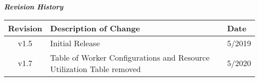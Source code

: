 \iffalse
This file is protected by Copyright. Please refer to the COPYRIGHT file
distributed with this source distribution.

This file is part of OpenCPI <http://www.opencpi.org>

OpenCPI is free software: you can redistribute it and/or modify it under the
terms of the GNU Lesser General Public License as published by the Free Software
Foundation, either version 3 of the License, or (at your option) any later
version.

OpenCPI is distributed in the hope that it will be useful, but WITHOUT ANY
WARRANTY; without even the implied warranty of MERCHANTABILITY or FITNESS FOR A
PARTICULAR PURPOSE. See the GNU Lesser General Public License for more details.

You should have received a copy of the GNU Lesser General Public License along
with this program. If not, see <http://www.gnu.org/licenses/>.
\fi

\def\comp{matchstiq\_{}z1\_{}gp\_{}out}
\edef\ecomp{matchstiq_z1_gp_out}
\def\Comp{Matchstiq Z1 GP Out}
\def\docTitle{\Comp{} Component Data Sheet}
\def\snippetpath{../../../../../../../../doc/av/tex/snippets}



\maketitle
\thispagestyle{empty}
\newpage

\begin{center}
	\textit{\textbf{Revision History}}
		\begin{table}[H]
		\label{table:revisions} %
		\begin{tabularx}{\textwidth}{|c|X|l|}
			\hline
			\rowcolor{blue}
			\textbf{Revision} & \textbf{Description of Change} & \textbf{Date} \\
		    \hline
		    v1.5 & Initial Release & 5/2019 \\
		    \hline
		    v1.7 & Table of Worker Configurations and Resource Utilization Table removed & 5/2020 \\
			\hline
		\end{tabularx}
	\end{table}
\end{center}	
\newpage

